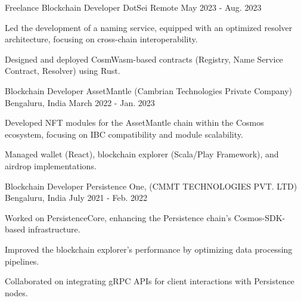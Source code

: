 \begin{cventries}
  \cventry
    {Freelance Blockchain Developer} %
    {DotSei} %
    {Remote} %
    {May 2023 - Aug. 2023} %
    {
      \begin{cvitems} %
        \item {Led the development of a naming service, equipped with an optimized resolver architecture, focusing on cross-chain interoperability.}
        \item {Designed and deployed CosmWasm-based contracts (Registry, Name Service Contract, Resolver) using Rust.}
      \end{cvitems}
    }

  \cventry
    {Blockchain Developer} %
    {AssetMantle (Cambrian Technologies Private Company)} %
    {Bengaluru, India} %
    {March 2022 - Jan. 2023} %
    {
      \begin{cvitems} %
        \item {Developed NFT modules for the AssetMantle chain within the Cosmos ecosystem, focusing on IBC compatibility and module scalability.}
        \item {Managed wallet (React), blockchain explorer (Scala/Play Framework), and airdrop implementations.}
      \end{cvitems}
    }

  \cventry
    {Blockchain Developer} %
    {Persistence One, (CMMT TECHNOLOGIES PVT. LTD)} %
    {Bengaluru, India} %
    {July 2021 - Feb. 2022} %
    {
      \begin{cvitems} %
        \item {Worked on PersistenceCore, enhancing the Persistence chain's Cosmos-SDK-based infrastructure.}
        \item {Improved the blockchain explorer’s performance by optimizing data processing pipelines.}
        \item {Collaborated on integrating gRPC APIs for client interactions with Persistence nodes.}
      \end{cvitems}
    }


\end{cventries}

